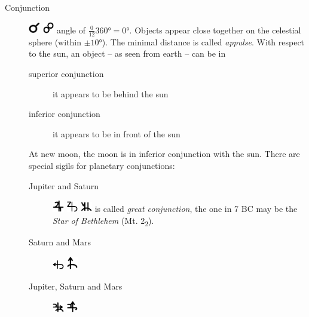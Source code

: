 \documentclass[british,final,landscape]{scrartcl}
\begin{document}
\begin{refsection}
\begin{description}
   \item[Conjunction]{\includegraphics[width=5mm]{Astrology/Conjunction} \includegraphics[width=5mm]{Astrology/Conjunction2} angle of \(\frac{0}{12} \ang{360} = \ang{0}\). Objects appear close together on the celestial sphere (within \(\pm \ang{10}\)). The minimal distance is called \emph{appulse}. With respect to the sun, an object -- as seen from earth -- can be in
      \begin{description}
        \item[superior conjunction]{it appears to be behind the sun }
        \item[inferior conjunction]{it appears to be in front of the sun}
      \end{description}
      At new moon, the moon is in inferior conjunction with the sun.
      There are special sigils for planetary conjunctions:
      \begin{description}
        \item[Jupiter and Saturn]{\includegraphics[width=5mm]{Astrology/ConjunctionJupiterSaturn} \includegraphics[width=5mm]{Astrology/ConjunctionJupiterSaturn2} \includegraphics[width=5mm]{Astrology/ConjunctionJupiterSaturn3} is called \emph{great conjunction}, the one in 7 BC may be the \emph{Star of Bethlehem} (Mt. 2\textsubscript{2}).}
        \item[Saturn and Mars]{\includegraphics[width=5mm]{Astrology/ConjunctionSaturnMars} \includegraphics[width=5mm]{Astrology/ConjunctionSaturnMars2} }
        \item[Jupiter, Saturn and Mars]{\includegraphics[width=5mm]{Astrology/ConjunctionJupiterSaturnMars} \includegraphics[width=5mm]{Astrology/ConjunctionJupiterSaturnMars2} }

\end{description}}
\end{description}
\end{refsection}
\end{document}
